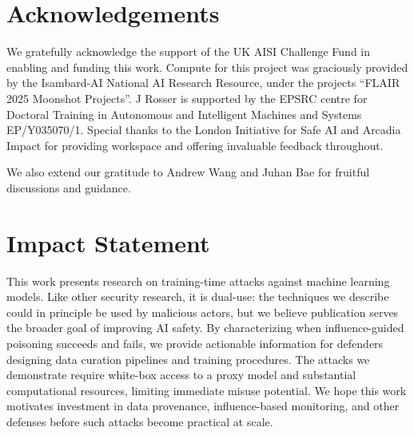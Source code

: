 \documentclass{article} %
\begin{document}



\section*{Acknowledgements}

We gratefully acknowledge the support of the UK AISI Challenge Fund in enabling and funding this work. Compute for this project was graciously provided by the Isambard-AI National AI Research Resource, under the projects ``FLAIR 2025 Moonshot Projects''. J Rosser is supported by the EPSRC centre for Doctoral Training in Autonomous and Intelligent
Machines and Systems EP/Y035070/1. Special thanks to the London Initiative for Safe AI and Arcadia Impact for providing workspace and offering invaluable feedback throughout.

We also extend our gratitude to Andrew Wang and Juhan Bae for fruitful discussions and guidance.


\section*{Impact Statement}

This work presents research on training-time attacks against machine learning models. Like other security research, it is dual-use: the techniques we describe could in principle be used by malicious actors, but we believe publication serves the broader goal of improving AI safety. By characterizing when influence-guided poisoning succeeds and fails, we provide actionable information for defenders designing data curation pipelines and training procedures. The attacks we demonstrate require white-box access to a proxy model and substantial computational resources, limiting immediate misuse potential. We hope this work motivates investment in data provenance, influence-based monitoring, and other defenses before such attacks become practical at scale.



\end{document}
